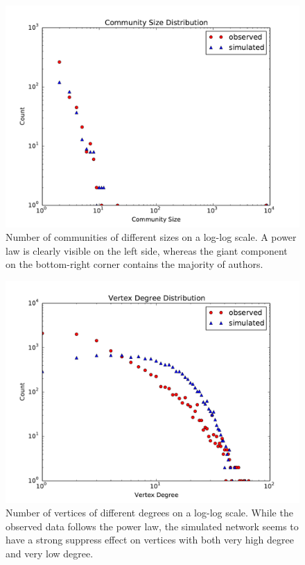 \documentclass[11pt,a4paper]{article}
\begin{document}
\begin{figure}[htbp]
	\centering
	\includegraphics[scale=0.55]{exp_community_size_distro.pdf}
	\caption{Number of communities of different sizes on a log-log scale. A power law is clearly visible on the left side, whereas the giant component on the bottom-right corner contains the majority of authors.}
	\label{fig:exp_community_size_distro}
\end{figure}
\begin{figure}[htbp]
	\centering
	\includegraphics[scale=0.55]{exp_degree_distro.pdf}
	\caption{Number of vertices of different degrees on a log-log scale. While the observed data follows the power law, the simulated network seems to have a strong suppress effect on vertices with both very high degree and very low degree.}
	\label{fig:exp_degree_distro}
\end{figure}
\end{document}
